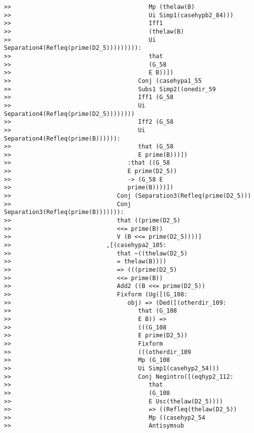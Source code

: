 \documentclass[12pt]{article}
\begin{document}
\begin{verbatim}
>>                                       Mp (thelaw(B)
>>                                       Ui Simp1(casehypb2_84)))
>>                                       Iff1
>>                                       (thelaw(B)
>>                                       Ui Separation4(Refleq(prime(D2_5))))))))):
>>                                       that
>>                                       (G_58
>>                                       E B))])
>>                                    Conj (casehypa1_55
>>                                    Subs1 Simp2((onedir_59
>>                                    Iff1 (G_58
>>                                    Ui Separation4(Refleq(prime(D2_5))))))))
>>                                    Iff2 (G_58
>>                                    Ui Separation4(Refleq(prime(B)))))):
>>                                    that (G_58
>>                                    E prime(B)))])
>>                                 :that ((G_58
>>                                 E prime(D2_5))
>>                                 -> (G_58 E
>>                                 prime(B))))])
>>                              Conj (Separation3(Refleq(prime(D2_5)))
>>                              Conj Separation3(Refleq(prime(B))))))):
>>                              that ((prime(D2_5)
>>                              <<= prime(B))
>>                              V (B <<= prime(D2_5))))]
>>                           ,[(casehypa2_105:
>>                              that ~((thelaw(D2_5)
>>                              = thelaw(B))))
>>                              => (((prime(D2_5)
>>                              <<= prime(B))
>>                              Add2 ((B <<= prime(D2_5))
>>                              Fixform (Ug([(G_108:
>>                                 obj) => (Ded([(otherdir_109:
>>                                    that (G_108
>>                                    E B)) =>
>>                                    (((G_108
>>                                    E prime(D2_5))
>>                                    Fixform
>>                                    (((otherdir_109
>>                                    Mp (G_108
>>                                    Ui Simp1(casehyp2_54)))
>>                                    Conj Negintro([(eqhyp2_112:
>>                                       that
>>                                       (G_108
>>                                       E Usc(thelaw(D2_5))))
>>                                       => ((Refleq(thelaw(D2_5))
>>                                       Mp ((casehyp2_54
>>                                       Antisymsub

\end{verbatim}
\end{document}
